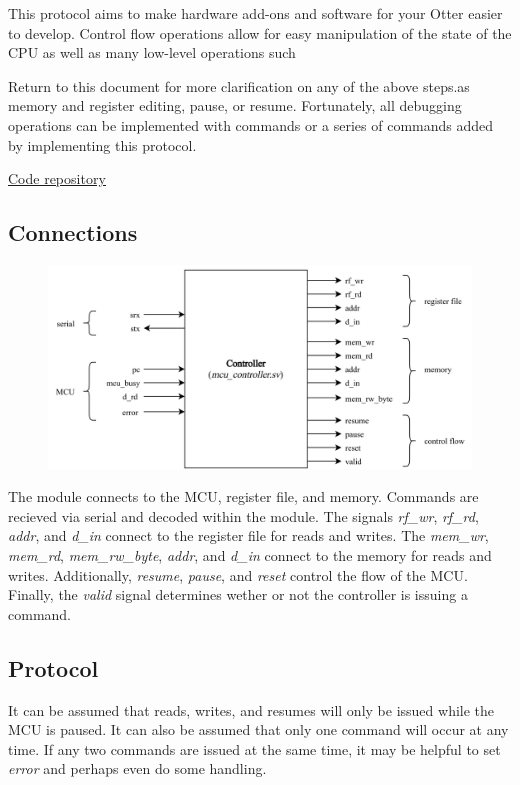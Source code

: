 \documentclass[10pt,a4paper]{article}
\begin{document}
This protocol aims to make hardware add-ons and software for your Otter easier to develop. Control flow operations
allow for easy manipulation of the state of the CPU as well as many low-level operations such


Return to this document for more clarification on any of the above steps.as memory and register editing, pause, or resume. Fortunately, all debugging operations can be
implemented with commands or a series of commands added by implementing this
protocol.

\medskip
\noindent\underline{\href{https://github.com/trmckay/riscv-uart-debugger}{Code repository}}

\subsection{Connections}

\begin{figure}[H]
    \includegraphics[width=\textwidth]{blackbox}
\end{figure}
\medskip

The module connects to the MCU, register file, and memory. Commands are recieved via serial
and decoded within the module. The signals \emph{rf\_wr}, \emph{rf\_rd}, \emph{addr}, and
\emph{d\_in} connect to the register file for reads and writes. The \emph{mem\_wr},
\emph{mem\_rd}, \emph{mem\_rw\_byte}, \emph{addr}, and \emph{d\_in} connect to the memory
for reads and writes. Additionally, \emph{resume}, \emph{pause}, and \emph{reset} control
the flow of the MCU\@. Finally, the \emph{valid} signal determines wether or not the controller
is issuing a command.

\subsection{Protocol}

It can be assumed that reads, writes, and resumes will only be issued while the MCU is paused. It
can also be assumed that only one command will occur at any time. If any two commands are issued at the
same time, it may be helpful to set \emph{error} and perhaps even do some handling.
\end{document}
